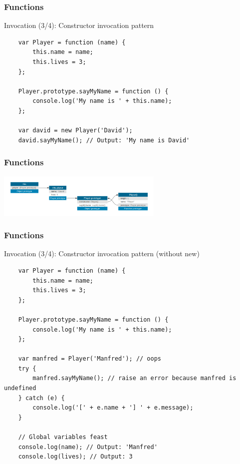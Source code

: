 \begin{frame}[fragile]
  \frametitle{Functions}

  \begin{block}{Invocation (3/4): Constructor invocation pattern}
    {\scriptsize
    \begin{verbatim}
    var Player = function (name) {
        this.name = name;
        this.lives = 3;
    };

    Player.prototype.sayMyName = function () {
        console.log('My name is ' + this.name);
    };

    var david = new Player('David');
    david.sayMyName(); // Output: 'My name is David'
    \end{verbatim}
    }
  \end{block}
\end{frame}

\begin{frame}[fragile]
  \frametitle{Functions}
  \begin{center}
    \includegraphics[width=300px]{images/basic_class.png}
  \end{center}
\end{frame}

\begin{frame}[fragile]
  \frametitle{Functions}

  \begin{block}{Invocation (3/4): Constructor invocation pattern (without new)}
    {\scriptsize
    \begin{verbatim}
    var Player = function (name) {
        this.name = name;
        this.lives = 3;
    };

    Player.prototype.sayMyName = function () {
        console.log('My name is ' + this.name);
    };

    var manfred = Player('Manfred'); // oops
    try {
        manfred.sayMyName(); // raise an error because manfred is undefined
    } catch (e) {
        console.log('[' + e.name + '] ' + e.message);
    }
    
    // Global variables feast
    console.log(name); // Output: 'Manfred'
    console.log(lives); // Output: 3
    \end{verbatim}
    }
  \end{block}
\end{frame}

